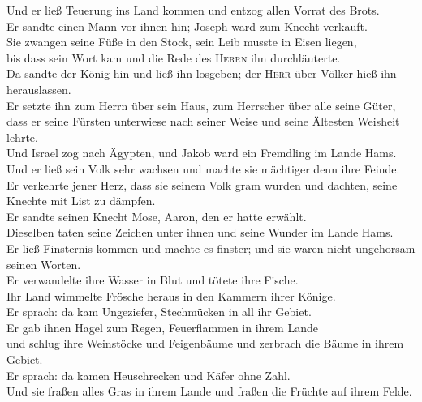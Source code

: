  Und er ließ Teuerung ins Land kommen und entzog allen
Vorrat des Brots.\\
 Er sandte einen Mann vor ihnen hin; Joseph ward zum
Knecht verkauft.\\
 Sie zwangen seine Füße in den Stock, sein Leib musste in
Eisen liegen,\\
 bis dass sein Wort kam und die Rede des \textsc{Herrn}
ihn durchläuterte.\\
 Da sandte der König hin und ließ ihn losgeben; der
\textsc{Herr} über Völker hieß ihn herauslassen.\\
 Er setzte ihn zum Herrn über sein Haus, zum Herrscher
über alle seine Güter,\\
 dass er seine Fürsten unterwiese nach seiner Weise und
seine Ältesten Weisheit lehrte.\\
 Und Israel zog nach Ägypten, und Jakob ward ein
Fremdling im Lande Hams.\\
 Und er ließ sein Volk sehr wachsen und machte sie
mächtiger denn ihre Feinde.\\
 Er verkehrte jener Herz, dass sie seinem Volk gram
wurden und dachten, seine Knechte mit List zu dämpfen.\\
 Er sandte seinen Knecht Mose, Aaron, den er hatte
erwählt.\\
 Dieselben taten seine Zeichen unter ihnen und seine
Wunder im Lande Hams.\\
 Er ließ Finsternis kommen und machte es finster; und sie
waren nicht ungehorsam seinen Worten.\\
 Er verwandelte ihre Wasser in Blut und tötete ihre
Fische.\\
 Ihr Land wimmelte Frösche heraus in den Kammern ihrer
Könige.\\
 Er sprach: da kam Ungeziefer, Stechmücken in all ihr
Gebiet.\\
 Er gab ihnen Hagel zum Regen, Feuerflammen in ihrem
Lande\\
 und schlug ihre Weinstöcke und Feigenbäume und zerbrach
die Bäume in ihrem Gebiet.\\
 Er sprach: da kamen Heuschrecken und Käfer ohne Zahl.\\
 Und sie fraßen alles Gras in ihrem Lande und fraßen die
Früchte auf ihrem Felde.\\
